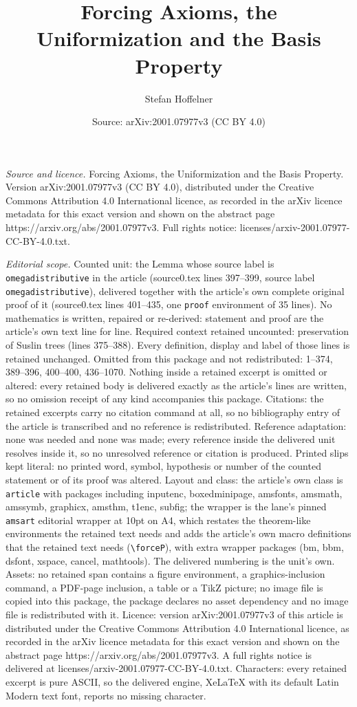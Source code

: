 \documentclass[10pt,a4paper]{amsart}
\title[Forcing Axioms, the Uniformization and the Basis Property]{Forcing Axioms, the Uniformization and the Basis Property}
\author{Stefan Hoffelner}
\date{Source: arXiv:2001.07977v3 (CC BY 4.0)}
\begin{document}
\maketitle

\noindent\emph{Source and licence.} Forcing Axioms, the Uniformization and the Basis Property. Version arXiv:2001.07977v3 (CC BY 4.0), distributed under the Creative Commons Attribution 4.0 International licence, as recorded in the arXiv licence metadata for this exact version and shown on the abstract page https://arxiv.org/abs/2001.07977v3. Full rights notice: licenses/arxiv-2001.07977-CC-BY-4.0.txt.\par\smallskip

\noindent\textit{Editorial scope.} Counted unit: the Lemma whose source label is \texttt{omegadistributive} in the article (source0.tex lines 397--399, source label \texttt{omegadistributive}), delivered together with the article's own complete original proof of it (source0.tex lines 401--435, one \texttt{proof} environment of 35 lines). No mathematics is written, repaired or re-derived: statement and proof are the article's own text line for line. Required context retained uncounted: preservation of Suslin trees (lines 375--388). Every definition, display and label of those lines is retained unchanged. Omitted from this package and not redistributed: 1--374, 389--396, 400--400, 436--1070. Nothing inside a retained excerpt is omitted or altered: every retained body is delivered exactly as the article's lines are written, so no omission receipt of any kind accompanies this package. Citations: the retained excerpts carry no citation command at all, so no bibliography entry of the article is transcribed and no reference is redistributed. Reference adaptation: none was needed and none was made; every reference inside the delivered unit resolves inside it, so no unresolved reference or citation is produced. Printed slips kept literal: no printed word, symbol, hypothesis or number of the counted statement or of its proof was altered. Layout and class: the article's own class is \texttt{article} with packages including inputenc, boxedminipage, amsfonts, amsmath, amssymb, graphicx, amsthm, t1enc, subfig; the wrapper is the lane's pinned \texttt{amsart} editorial wrapper at 10pt on A4, which restates the theorem-like environments the retained text needs and adds the article's own macro definitions that the retained text needs (\texttt{\textbackslash forceP}), with extra wrapper packages (bm, bbm, dsfont, xspace, cancel, mathtools). The delivered numbering is the unit's own. Assets: no retained span contains a figure environment, a graphics-inclusion command, a PDF-page inclusion, a table or a TikZ picture; no image file is copied into this package, the package declares no asset dependency and no image file is redistributed with it. Licence: version arXiv:2001.07977v3 of this article is distributed under the Creative Commons Attribution 4.0 International licence, as recorded in the arXiv licence metadata for this exact version and shown on the abstract page https://arxiv.org/abs/2001.07977v3. A full rights notice is delivered at licenses/arxiv-2001.07977-CC-BY-4.0.txt. Characters: every retained excerpt is pure ASCII, so the delivered engine, XeLaTeX with its default Latin Modern text font, reports no missing character.
\end{document}
